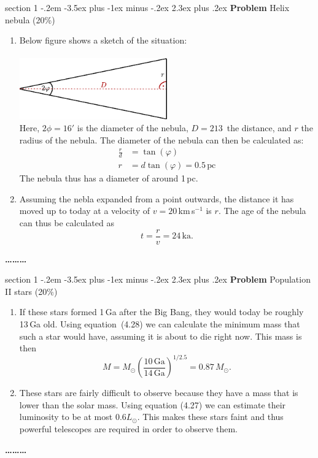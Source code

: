 \documentclass[letterpaper,12pt,twoside=false,DIV=11]{scrartcl}
\makeatletter
\newenvironment{problem}{\@startsection
    {section}
    {1}
    {-.2em}
    {-3.5ex plus -1ex minus -.2ex}
    {2.3ex plus .2ex}
    {
        \pagebreak[3] %
        \noindent\sffamily\bfseries Problem
    }
}
{
    \begin{center}\large\bfseries\ldots\ldots\ldots\end{center}
}
\makeatother
\begin{document}
\begin{problem}{Helix nebula (20\%)}
\begin{enumerate}
    \item{Below figure shows a sketch of the situation:\\ \\
          \includegraphics[width=0.5\textwidth]{helix_nebula_sketch}\\
          Here, $2\phi = 16'$ is the diameter of the nebula, $D = 213$\, the distance, and $r$ the radius of the nebula. The diameter of the nebula can then be calculated as:
          \begin{align}
              \frac{r}{d} &= \tan(\varphi)\\
              r &= d \tan(\varphi) = 0.5\,\mathrm{pc} 
          \end{align}}
          The nebula thus has a diameter of around 1\,pc.
    \item Assuming the nebla expanded from a point outwards, the distance it has moved up to today at a velocity of $v=20$\,km\,s$^{-1}$ is $r$. The age of the nebula can thus be calculated as
    \begin{equation}
        t = \frac{r}{v} = 24\,\mathrm{ka}.
    \end{equation}
\end{enumerate}

\end{problem}

\begin{problem}{Population II stars (20\%)}
\begin{enumerate}
    \item If these stars formed 1\,Ga after the Big Bang, they would today be roughly 13\,Ga old. Using equation~(4.28) we can calculate the minimum mass that such a star would have, assuming it is about to die right now. This mass is then
    \begin{equation}
        M = M_\odot \left(\frac{10\,\mathrm{Ga}}{14\,\mathrm{Ga}}\right)^{1/2.5} = 0.87\,M_\odot.
    \end{equation}
    \item These stars are fairly difficult to observe because they have a mass that is lower than the solar mass. Using equation (4.27) we can estimate their luminosity to be at most $0.6L_\odot$. This makes these stars faint and thus powerful telescopes are required in order to observe them.
\end{enumerate}
\end{problem}
\end{document}
